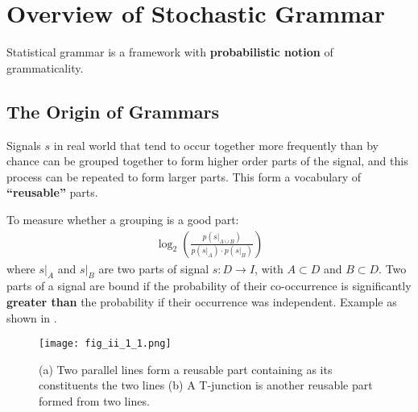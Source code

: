 \documentclass[../Notes_of_CaRiVaC.tex]{subfiles}
\begin{document}
\maketitle
\tableofcontents

\chapter{Overview of Stochastic Grammar}%
\label{sec:ii.1}
Statistical grammar is a framework with \textbf{probabilistic notion} of
grammaticality.

\section{The Origin of Grammars}%
\label{sec:ii.1.1}
Signals $s$ in real world that tend to occur together more frequently than by
chance can be grouped together to form higher order parts of the signal, and
this process can be repeated to form larger parts. This form a vocabulary of
\textbf{``reusable''} parts.

To measure whether a grouping is a good part:
%
\begin{align}
  \label{eq:ii.1.1}
  \log_2 \left( \frac{p(s\vert_{A \cup B})}{p(s\vert_{A}) \cdot p(s\vert_{B})} \right)
\end{align}
%
where $s\vert_{A}$ and $s\vert_{B}$ are two parts of signal $s: D \to I$,
with $A \subset D$ and $B \subset D$. Two parts of a signal are bound if the
probability of their co-occurrence is significantly \textbf{greater than} the
probability if their occurrence was independent. Example as shown in
.
%
\begin{figure}[!htpb]
  \centering
  \texttt{[image: fig\_ii\_1\_1.png]}
  \caption{(a) Two parallel lines form a reusable part containing as its
    constituents the two lines (b) A T-junction is another reusable part formed
    from two lines.}%
  \label{fig:ii.1.1}
\end{figure}
%
\end{document}
